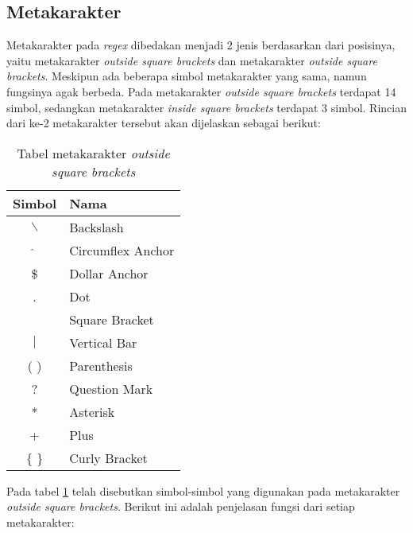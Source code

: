 \subsection{Metakarakter}

Metakarakter pada \textit{regex} dibedakan menjadi 2 jenis berdasarkan dari posisinya, yaitu metakarakter \textit{outside square brackets} dan metakarakter \textit{outside square brackets}. Meskipun ada beberapa simbol metakarakter yang sama, namun fungsinya agak berbeda. Pada metakarakter \textit{outside square brackets} terdapat 14 simbol, sedangkan metakarakter \textit{inside square brackets} terdapat 3 simbol. Rincian dari ke-2 metakarakter tersebut akan dijelaskan sebagai berikut:
	
\begin{table}[H]
	\renewcommand{\arraystretch}{1.5}
	\caption {Tabel metakarakter \textit{outside square brackets}} 
	\label{tab:metacharacters-outside}
	\begin{center}
		\begin{tabular}{|c|l|}
		\hline 
		Simbol & Nama \\ 
		\hline 
		$\backslash$ & Backslash \\ 
		\hline 
		$\hat{}$ & Circumflex Anchor\\ 
		\hline 
		\$ & Dollar Anchor\\ 
		\hline 
		. & Dot \\ 
		\hline 
		[ ] & Square Bracket \\ 
		\hline 
		$\vert$ & Vertical Bar \\ 
		\hline 
		( ) & Parenthesis \\ 
		\hline 
		? & Question Mark \\ 
		\hline 
		* & Asterisk \\ 
		\hline 
		+ & Plus \\ 
		\hline 
		$\lbrace$ $\rbrace$ & Curly Bracket \\ 
		\hline 
		\end{tabular} 
	\end{center}
\end{table}

Pada tabel \ref{tab:metacharacters-outside} telah disebutkan simbol-simbol yang digunakan pada metakarakter \textit{outside square brackets}. Berikut ini adalah penjelasan fungsi dari setiap metakarakter:

